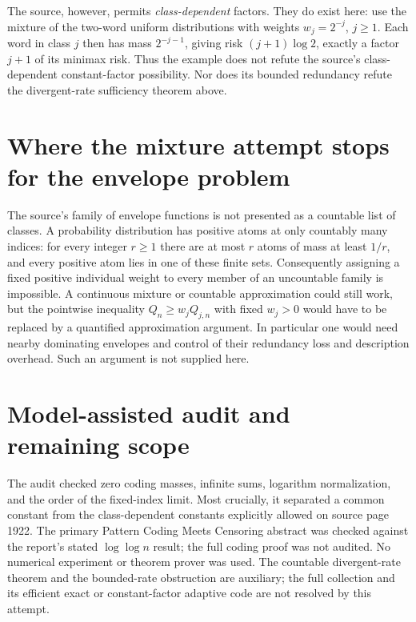 \documentclass[11pt]{article}
\begin{document}
The source, however, permits \emph{class-dependent} factors. They
do exist here: use the mixture of the two-word uniform distributions
with weights $w_j=2^{-j}$, $j\ge1$. Each word in class $j$ then has
mass $2^{-j-1}$, giving risk $(j+1)\log2$, exactly a factor $j+1$
of its minimax risk. Thus the example does not refute the source's
class-dependent constant-factor possibility. Nor does its bounded
redundancy refute the divergent-rate sufficiency theorem above.

\section{Where the mixture attempt stops for the envelope problem}
The source's family of envelope functions is not presented as a
countable list of classes. A probability distribution has positive
atoms at only countably many indices: for every integer $r\ge1$
there are at most $r$ atoms of mass at least $1/r$, and every positive
atom lies in one of these finite sets. Consequently assigning a
fixed positive individual weight to every member of an uncountable
family is impossible. A continuous mixture or countable approximation
could still work, but the pointwise inequality
$Q_n\ge w_jQ_{j,n}$ with fixed $w_j>0$ would have to be replaced
by a quantified approximation argument. In particular one would need
nearby dominating envelopes and control of their redundancy loss and
description overhead. Such an argument is not supplied here.

\section{Model-assisted audit and remaining scope}
The audit checked zero coding masses, infinite sums, logarithm
normalization, and the order of the fixed-index limit. Most crucially,
it separated a common constant from the class-dependent constants
explicitly allowed on source page 1922. The primary Pattern Coding
Meets Censoring abstract was checked against the report's stated
$\log\log n$ result; the full coding proof was not audited.
No numerical experiment or theorem prover was used. The countable
divergent-rate theorem and the bounded-rate obstruction are auxiliary;
the full collection and its efficient exact or constant-factor adaptive
code are not resolved by this attempt.
\end{document}
